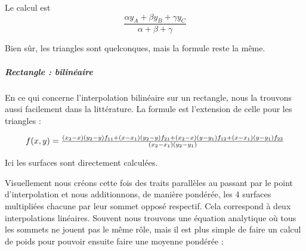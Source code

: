 Le calcul est
\begin{equation}
    \frac{\alpha y_A + \beta y_B + \gamma y_C}{\alpha + \beta + \gamma}
\end{equation}


\vspace{0.2cm}

Bien sûr, les triangles sont quelconques, mais la formule reste la même.

\subparagraph{Rectangle : bilinéaire}

En ce qui concerne l'interpolation bilinéaire sur un rectangle, nous la trouvons aussi facilement dans la littérature. La formule est l'extension de celle pour les triangles :

\begin{equation}
    \resizebox{0.9\hsize}{!}{$
    f(x, y) = \frac{(x_2 - x)(y_2 - y)f_{11} + (x - x_1)(y_2 - y)f_{21} + (x_2 - x)(y - y_1)f_{12} + (x - x_1)(y - y_1)f_{22}}{(x_2 - x_1)(y_2 - y_1)}
    $}
\end{equation}
                


Ici les surfaces sont directement calculées.

Visuellement nous créons cette fois des traits parallèles au passant par le point d'interpolation et nous additionnons, de manière pondérée, les 4 surfaces multipliées chacune par leur sommet opposé respectif. Cela correspond à deux interpolations linéaires. Souvent nous trouvons une équation analytique où tous les sommets ne jouent pas le même rôle, mais il est plus simple de faire un calcul de poids pour pouvoir ensuite faire une moyenne pondérée :


